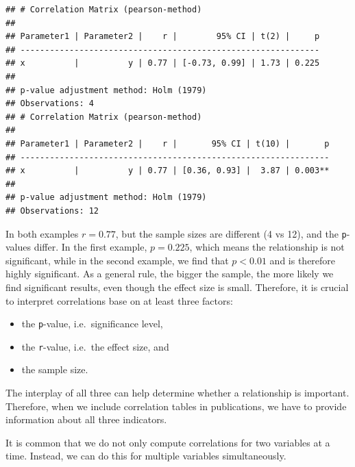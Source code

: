 \documentclass[
]{book}
\begin{document}
\begin{verbatim}
## # Correlation Matrix (pearson-method)
## 
## Parameter1 | Parameter2 |    r |        95% CI | t(2) |     p
## -------------------------------------------------------------
## x          |          y | 0.77 | [-0.73, 0.99] | 1.73 | 0.225
## 
## p-value adjustment method: Holm (1979)
## Observations: 4
## # Correlation Matrix (pearson-method)
## 
## Parameter1 | Parameter2 |    r |       95% CI | t(10) |       p
## ---------------------------------------------------------------
## x          |          y | 0.77 | [0.36, 0.93] |  3.87 | 0.003**
## 
## p-value adjustment method: Holm (1979)
## Observations: 12
\end{verbatim}

In both examples \(r = 0.77\), but the sample sizes are different (4 vs 12), and the \texttt{p}-values differ. In the first example, \(p = 0.225\), which means the relationship is not significant, while in the second example, we find that \(p < 0.01\) and is therefore highly significant. As a general rule, the bigger the sample, the more likely we find significant results, even though the effect size is small. Therefore, it is crucial to interpret correlations base on at least three factors:

\begin{itemize}
\item
  the \texttt{p}-value, i.e.~significance level,
\item
  the \texttt{r}-value, i.e.~the effect size, and
\item
  the sample size.
\end{itemize}

The interplay of all three can help determine whether a relationship is important. Therefore, when we include correlation tables in publications, we have to provide information about all three indicators.

It is common that we do not only compute correlations for two variables at a time. Instead, we can do this for multiple variables simultaneously.
\end{document}
